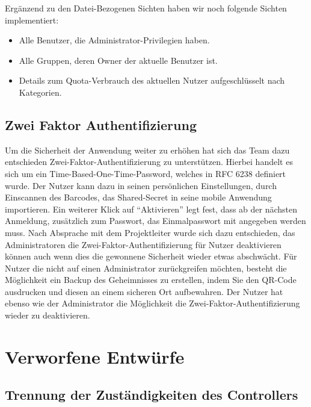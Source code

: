 \documentclass[12pt,DIV14,BCOR10mm,a4paper,parskip=half-,headsepline,headinclude,english,ngerman,bibliography=totocnumbered]{scrreprt}
\begin{document}
Ergänzend zu den Datei-Bezogenen Sichten haben wir noch folgende Sichten implementiert:

\begin{itemize}
	\item Alle Benutzer, die Administrator-Privilegien haben.
	\item Alle Gruppen, deren Owner der aktuelle Benutzer ist.
	\item Details zum Quota-Verbrauch des aktuellen Nutzer aufgeschlüsselt nach Kategorien.
\end{itemize}

\section{Zwei Faktor Authentifizierung}
Um die Sicherheit der Anwendung weiter zu erhöhen hat sich das Team dazu entschieden Zwei-Faktor-Authentifizierung zu unterstützen. Hierbei handelt es sich um ein Time-Based-One-Time-Password, welches in RFC 6238 \autocite{rfc6238} definiert wurde. Der Nutzer kann dazu in seinen persönlichen Einstellungen, durch Einscannen des Barcodes, das Shared-Secret in seine mobile Anwendung importieren. Ein weiterer Klick auf \enquote{Aktivieren} legt fest, dass ab der nächsten Anmeldung, zusätzlich zum Passwort, das Einmalpasswort mit angegeben werden muss. Nach Absprache mit dem Projektleiter wurde sich dazu entschieden, das Administratoren die Zwei-Faktor-Authentifizierung für Nutzer deaktivieren können auch wenn dies die gewonnene Sicherheit wieder etwas abschwächt. Für Nutzer die nicht auf einen Administrator zurückgreifen möchten, besteht die Möglichkeit ein Backup des Geheimnisses zu erstellen, indem Sie den QR-Code ausdrucken und diesen an einem sicheren Ort aufbewahren. Der Nutzer hat ebenso wie der Administrator die Möglichkeit die Zwei-Faktor-Authentifizierung wieder zu deaktivieren.

\chapter{Verworfene Entwürfe}

\section{Trennung der Zuständigkeiten des Controllers}
\label{architecture:manager-class-creation}
\end{document}
